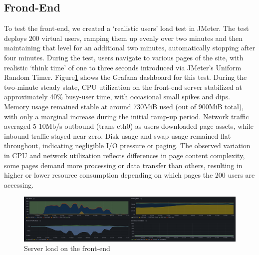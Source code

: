 \documentclass[10pt,a4paper,kul]{kulakarticle} %
\begin{document}
		\subsection{Frond-End}
			To test the front‑end, we created a `realistic users' load test in JMeter. The test deploys 200 virtual users, ramping them up evenly over two minutes and then maintaining that level for an additional two minutes, automatically stopping after four minutes. During the test, users navigate to various pages of the site, with realistic `think time' of one to three seconds introduced via JMeter’s Uniform Random Timer. Figure\ref{fig:front-end-load} shows the Grafana dashboard for this test. During the two-minute steady state, CPU utilization on the front-end server stabilized at approximately 40\% busy-user time, with occasional small spikes and dips. Memory usage remained stable at around 730MiB used (out of 900MiB total), with only a marginal increase during the initial ramp-up period. Network traffic averaged 5-10Mb/s outbound (trans eth0) as users downloaded page assets, while inbound traffic stayed near zero. Disk usage and swap usage remained flat throughout, indicating negligible I/O pressure or paging. The observed variation in CPU and network utilization reflects differences in page content complexity, some pages demand more processing or data transfer than others, resulting in higher or lower resource consumption depending on which pages the 200 users are accessing.
			
			\begin{figure}[h!]
				\centering
				\includegraphics[width=0.9\linewidth]{images/front-end-load}
				\caption{Server load on the front-end}
				\label{fig:front-end-load}
			\end{figure}
			
	
\end{document}
